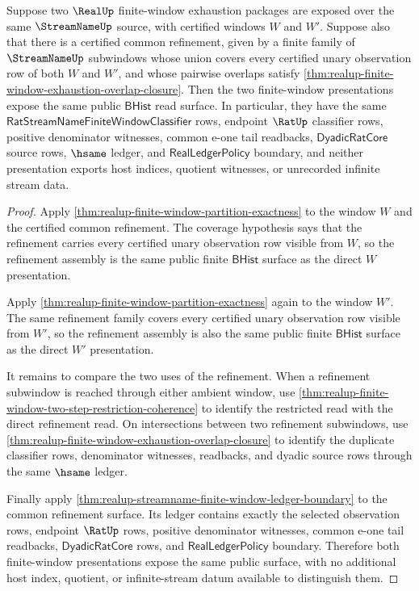 \begin{theorem}
\label{thm:realup-finite-window-directed-refinement-seal}
Suppose two $\RealUp$ finite-window exhaustion packages are exposed over the
same $\StreamNameUp$ source, with certified windows $W$ and $W'$. Suppose also
that there is a certified common refinement, given by a finite family of
$\StreamNameUp$ subwindows whose union covers every certified unary observation
row of both $W$ and $W'$, and whose pairwise overlaps satisfy
\autoref{thm:realup-finite-window-exhaustion-overlap-closure}. Then the two
finite-window presentations expose the same public $\mathsf{BHist}$ read
surface. In particular, they have the same
$\mathsf{RatStreamNameFiniteWindowClassifier}$ rows, endpoint $\RatUp$
classifier rows, positive denominator witnesses, common e-one tail readbacks,
$\mathsf{DyadicRatCore}$ source rows, $\hsame$ ledger, and
$\mathsf{RealLedgerPolicy}$ boundary, and neither presentation exports host
indices, quotient witnesses, or unrecorded infinite stream data.
\end{theorem}
\begin{proof}
Apply \autoref{thm:realup-finite-window-partition-exactness} to the window
$W$ and the certified common refinement. The coverage hypothesis says that the
refinement carries every certified unary observation row visible from $W$, so
the refinement assembly is the same public finite $\mathsf{BHist}$ surface as
the direct $W$ presentation.

Apply \autoref{thm:realup-finite-window-partition-exactness} again to the
window $W'$. The same refinement family covers every certified unary
observation row visible from $W'$, so the refinement assembly is also the same
public finite $\mathsf{BHist}$ surface as the direct $W'$ presentation.

It remains to compare the two uses of the refinement. When a refinement
subwindow is reached through either ambient window, use
\autoref{thm:realup-finite-window-two-step-restriction-coherence} to identify
the restricted read with the direct refinement read. On intersections between
two refinement subwindows, use
\autoref{thm:realup-finite-window-exhaustion-overlap-closure} to identify the
duplicate classifier rows, denominator witnesses, readbacks, and dyadic source
rows through the same $\hsame$ ledger.

Finally apply \autoref{thm:realup-streamname-finite-window-ledger-boundary} to
the common refinement surface. Its ledger contains exactly the selected
observation rows, endpoint $\RatUp$ rows, positive denominator witnesses,
common e-one tail readbacks, $\mathsf{DyadicRatCore}$ rows, and
$\mathsf{RealLedgerPolicy}$ boundary. Therefore both finite-window
presentations expose the same public surface, with no additional host index,
quotient, or infinite-stream datum available to distinguish them.
\end{proof}

